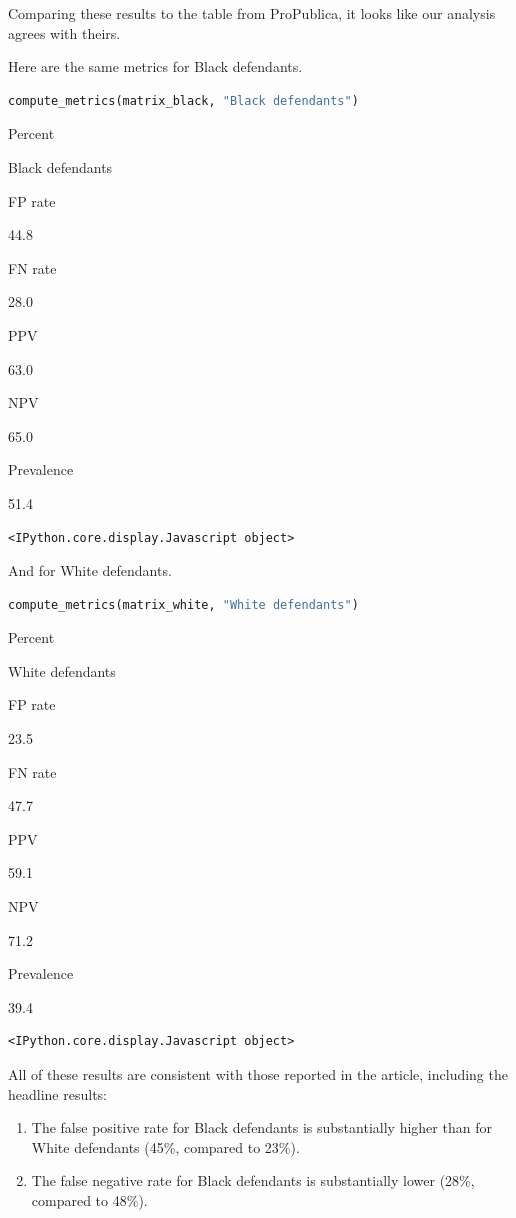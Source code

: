 Comparing these results to the table from ProPublica, it looks like our
analysis agrees with theirs.

Here are the same metrics for Black defendants.

\begin{lstlisting}[language=Python,style=source]
compute_metrics(matrix_black, "Black defendants")
\end{lstlisting}

Percent

Black defendants

FP rate

44.8

FN rate

28.0

PPV

63.0

NPV

65.0

Prevalence

51.4

\begin{lstlisting}[style=output]
<IPython.core.display.Javascript object>
\end{lstlisting}

And for White defendants.

\begin{lstlisting}[language=Python,style=source]
compute_metrics(matrix_white, "White defendants")
\end{lstlisting}

Percent

White defendants

FP rate

23.5

FN rate

47.7

PPV

59.1

NPV

71.2

Prevalence

39.4

\begin{lstlisting}[style=output]
<IPython.core.display.Javascript object>
\end{lstlisting}

All of these results are consistent with those reported in the article,
including the headline results:

\begin{enumerate}
\def\labelenumi{\arabic{enumi}.}
\item
  The false positive rate for Black defendants is substantially higher
  than for White defendants (45\%, compared to 23\%).
\item
  The false negative rate for Black defendants is substantially lower
  (28\%, compared to 48\%).
\end{enumerate}

